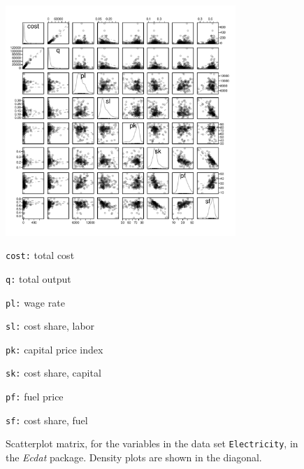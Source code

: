 \begin{figure}[h]
\vspace*{-18pt}
\parbox[c]{0.7\textwidth}{
\begin{Schunk}


\centerline{\includegraphics[width=0.775\textwidth]{figs/8-Elec-spm-1} }

\end{Schunk}
}
\hspace*{0.05\textwidth}
\parbox[c]{0.23\linewidth}{
\small
\begin{list}{}{\leftmargin=2em \setlength{\itemsep}{5pt} \setlength{\parsep}{1pt}}
\setlength{\labelwidth}{3em}
\item[\texttt{cost:}]
 total cost
\item[\texttt{q:}]
 total output
\item[\texttt{pl:}]
 wage rate
\item[\texttt{sl:}]
 cost share, labor
\item[\texttt{pk:}]
 capital price index
\item[\texttt{sk:}]
 cost share,
 capital
\item[\texttt{pf:}]
 fuel price
\item[\texttt{sf:}]
 cost share, fuel
\end{list}
}
\vspace*{-9pt}

\caption{Scatterplot matrix, for the variables in the data set
  \texttt{Electricity}, in the {\em Ecdat} package. Density
  plots are shown in the diagonal.\label{fig:elec-spm}}
\end{figure}

